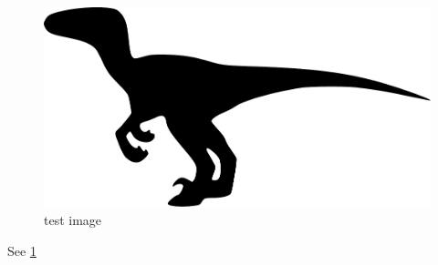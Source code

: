 \documentclass{scrartcl}
\begin{document}
\begin{figure}
	\centering
	\includegraphics{raptor}
	\caption{test image}
	\label{fig:testimage}
\end{figure}

See \cref{fig:testimage}
\end{document}
